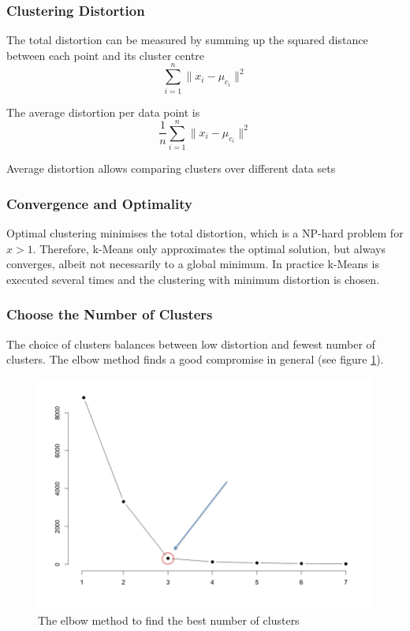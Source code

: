 \documentclass[11pt]{article}
\begin{document}
\subsubsection{Clustering Distortion}

The total distortion can be measured by summing up the squared distance between each point and its cluster centre
\begin{equation}
    \sum_{i=1}^{n}\| x_i -\mu_{c_i} \|^2
\end{equation}

The average distortion per data point is
\begin{equation}
    \frac{1}{n}\sum_{i=1}^{n}\| x_i -\mu_{c_i} \|^2
\end{equation}

Average distortion allows comparing clusters over different data sets

\subsubsection{Convergence and Optimality}

Optimal clustering minimises the total distortion, which is a NP-hard problem for $x>1$. Therefore, k-Means only approximates the optimal solution, but always converges, albeit not necessarily to a global minimum. In practice k-Means is executed several times and the clustering with minimum distortion is chosen.

\subsubsection{Choose the Number of Clusters}

The choice of clusters balances between low distortion and fewest number of clusters. The elbow method finds a good compromise in general (see figure \ref{fig:elbowmethod}).

\begin{figure}[htb!]
    \centering
    \includegraphics[keepaspectratio, width=0.4\linewidth]{Pictures/elbow_method}
    \caption{The elbow method to find the best number of clusters}
    \label{fig:elbowmethod}
\end{figure}
\end{document}
